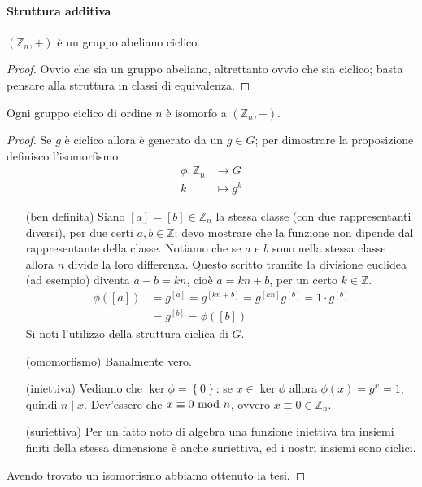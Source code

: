 \paragraph{Struttura additiva}
\begin{proposizione}
	$\left(\mathbb{Z}_n,+\right)$ è un gruppo abeliano ciclico.
\end{proposizione}
\begin{proof}
	Ovvio che sia un gruppo abeliano, altrettanto ovvio che sia ciclico; basta pensare alla struttura in classi di equivalenza.
\end{proof}
\begin{proposizione}
	Ogni gruppo ciclico di ordine $n$ è isomorfo a $\left(\mathbb{Z}_n,+\right)$.
\end{proposizione}
\begin{proof}
	Se $g$ è ciclico allora è generato da un $g\in G$; per dimostrare la proposizione definisco l'isomorfismo
	\begin{align*}
	\phi:\mathbb{Z}_n&\longrightarrow G\\
	k &\longmapsto g^k
	\end{align*}
	\begin{itemize}
		\item[(ben definita)] Siano $[a]=[b]\in\mathbb{Z}_n$ la stessa classe (con due rappresentanti diversi), per due certi $a,b\in\mathbb{Z}$; devo mostrare che la funzione non dipende dal rappresentante della classe. Notiamo che se $a$ e $b$ sono nella stessa classe allora $n$ divide la loro differenza. Questo scritto tramite la divisione euclidea (ad esempio) diventa $a-b=kn$, cioè $a=kn+b$, per un certo $k\in\mathbb{Z}$.
		\begin{align*}
		\phi([a])&=g^{[a]}=g^{[kn+b]}=g^{[kn]}g^{[b]}=1\cdot g^{[b]}\\
		&=g^{[b]}=\phi([b])
		\end{align*}
		Si noti l'utilizzo della struttura ciclica di $G$.
		\item[(omomorfismo)] Banalmente vero.
		\item[(iniettiva)] Vediamo che $\ker \phi = \left\{0\right\}$: se $x \in \ker \phi$ allora $\phi(x) = g^x = 1$, quindi $n \mid x$. Dev'essere che $x \equiv 0 \ \mathrm{mod}\ n$, ovvero $x \equiv 0 \in \mathbb{Z}_n$. 
		\item[(suriettiva)] Per un fatto noto di algebra una funzione iniettiva tra insiemi finiti della stessa dimensione è anche suriettiva, ed i nostri insiemi sono ciclici.
	\end{itemize}
	Avendo trovato un isomorfismo abbiamo ottenuto la tesi.
\end{proof}
